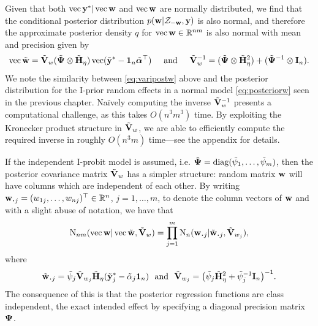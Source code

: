 Given that both $\operatorname{vec} {\mathbf y}^* | \operatorname{vec} {\mathbf w}$ and $\operatorname{vec}{\mathbf w}$ are normally distributed, we find that the conditional posterior distribution $p({\mathbf w}|{\mathcal Z}_{-{\mathbf w}},{\mathbf y})$ is also normal, and therefore the approximate posterior density $q$ for $\operatorname{vec} {\mathbf w} \in \mathbb{R}^{nm}$ is also normal with mean and precision given by
\begin{gather}\label{eq:varipostw}
   \operatorname{vec} \tilde{{\mathbf w}} = \tilde{{\mathbf V}}_w 
    (\tilde{{\bm\Psi}} \otimes \tilde{{\mathbf H}}_\eta) \operatorname{vec} (\tilde{{\mathbf y}}^* - {\mathbf 1}_n\tilde{{\bm\alpha}}^\top)
  \hspace{0.5cm}\text{and}\hspace{0.5cm} 
  \tilde {{\mathbf V}}_w^{-1} = (\tilde{{\bm\Psi}} \otimes \tilde{{\mathbf H}}_\eta^2) + (\tilde{{\bm\Psi}}^{-1} \otimes {\mathbf I}_n).
\end{gather}
We note the similarity between \cref{eq:varipostw} above and the posterior distribution for the I-prior random effects in a normal model \cref{eq:posteriorw} seen in the previous chapter.
Naïvely computing the inverse $\tilde{{\mathbf V}}_w^{-1}$ presents a computational challenge, as this takes $O(n^3m^3)$ time. 
By exploiting the Kronecker product structure in $\tilde{{\mathbf V}}_w$, we are able to efficiently compute the required inverse in roughly $O(n^3m)$ time---see the appendix for details.

If the independent I-probit model is assumed, i.e. $\tilde{{\bm\Psi}} = \operatorname{diag}(\tilde\psi_1,\dots,\tilde\psi_m)$, then the posterior covariance matrix $\tilde{{\mathbf V}}_w$ has a simpler structure:  random matrix ${\mathbf w}$ will have columns which are independent of each other.
By writing $\bw_{\bigcdot j} = (w_{1j},\dots,w_{nj})^\top \in \bbR^n$, $j=1,\dots,m$, to denote the column vectors of ${\mathbf w}$ and with a slight abuse of notation, we have that
\begin{align*}
  \N_{nm}(\vecc \bw|\vecc\wtilde, \tilde\bV_w) 
  = \prod_{j=1}^m \N_{n}(\bw_{\bigcdot j}|\tilde\bw_{\bigcdot j}, \tilde\bV_{w_j}),
\end{align*}
where 
\[
  \tilde \bw_{\bigcdot j} = \tilde\psi_j\tilde \bV_{w_j}\tilde\bH_\eta (\tilde\by^*_j - \tilde\alpha_j\bone_n) \ \text{ and } \ \tilde \bV_{w_j} = \big(\tilde\psi_j\tilde\bH_{\eta}^2 + \tilde\psi_j^{-1}\bI_n \big)^{-1}.
\]
The consequence of this is that the posterior regression functions are class independent, the exact intended effect by specifying a diagonal precision matrix ${\bm\Psi}$.

